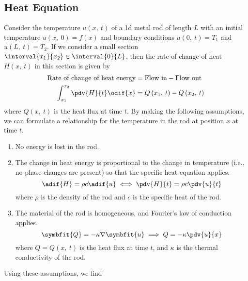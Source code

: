 \documentclass{article}
\begin{document}
\subsection{Heat Equation}
Consider the temperature \(u\left( x,\: t \right)\) of a 1d metal rod of length \(L\) with an initial temperature \(u\left( x,\: 0 \right) = f\left( x \right)\)
and boundary conditions \(u\left( 0,\: t \right) = T_1\) and \(u\left( L,\: t \right) = T_2\).
If we consider a small section \(\interval{x_1}{x_2} \in \interval{0}{L}\), then the rate of change of heat \(H\left( x,\: t \right)\) in this section is given by
\begin{align*}
    \text{Rate of change of heat energy} & = \text{Flow in} - \text{Flow out}                    \\
    \int_{x_1}^{x_2} \pdv{H}{t} \odif{x} & = Q\left( x_1,\: t \right) - Q\left( x_2,\: t \right)
\end{align*}
where \(Q\left( x,\: t \right)\) is the heat flux at time \(t\).
By making the following assumptions, we can formulate a relationship for the temperature in the rod at position \(x\) at time \(t\).
\begin{enumerate}
    \item No energy is lost in the rod.
    \item The change in heat energy is proportional to the change in temperature (i.e., no phase changes are present) so that the specific heat equation applies.
          \begin{equation*}
              \adif{H} = \rho c \adif{u} \iff \pdv{H}{t} = \rho c \pdv{u}{t}
          \end{equation*}
          where \(\rho\) is the density of the rod and \(c\) is the specific heat of the rod.
    \item The material of the rod is homogeneous, and Fourier's law of conduction applies.
          \begin{equation*}
              \symbfit{Q} = -\kappa \nabla \symbfit{u} \implies Q = -\kappa \pdv{u}{x}
          \end{equation*}
          where \(Q = Q\left( x,\: t \right)\) is the heat flux at time \(t\), and \(\kappa\) is the thermal conductivity of the rod.
\end{enumerate}
Using these assumptions, we find
\end{document}

